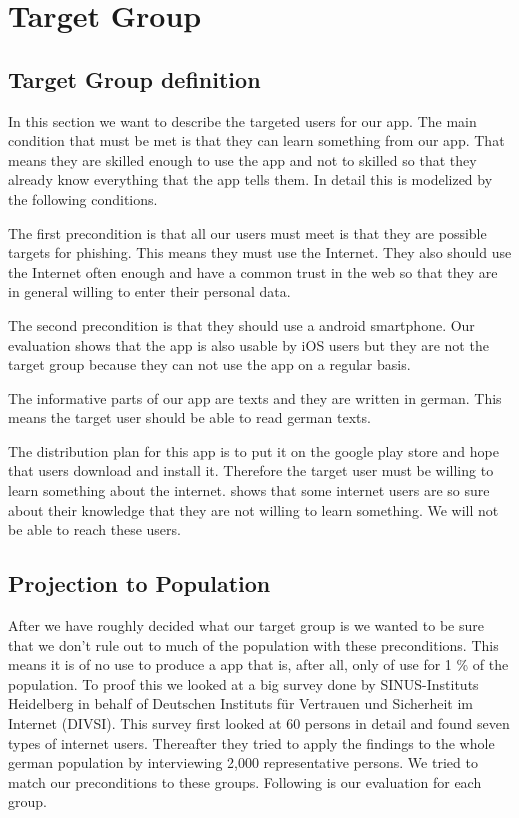 \section{Target Group}
\label{s:target_group}

\subsection{Target Group definition}
In this section we want to describe the targeted users for our app.
The main condition that must be met is that they can learn something from our app.
That means they are skilled enough to use the app and not to skilled so that they already know everything that the app tells them.
In detail this is modelized by the following conditions.
\begin{description}[leftmargin=0cm]
\item[Attackabilty] The first precondition is that all our users must meet is that they are possible targets for phishing.
This means they must use the Internet.
They also should use the Internet often enough and have a common trust in the web so that they are in general willing to enter their personal data.
\cite{divsi2012divsi}
\item[Android users] The second precondition is that they should use a android smartphone.
Our evaluation shows that the app is also usable by iOS users but they are not the target group because they can not use the app on a regular basis.
\item[Language] The informative parts of our app are texts and they are written in german.
This means the target user should be able to read german texts.
\item[Motivation] The distribution plan for this app is to put it on the google play store and hope that users download and install it.
Therefore the target user must be willing to learn something about the internet.
\cite{divsi2012divsi} shows that some internet users are so sure about their knowledge that they are not willing to learn something.
We will not be able to reach these users.
\end{description}

\subsection{Projection to Population}
After we have roughly decided what our target group is we wanted to be sure that we don't rule out to much of the population with these preconditions.
This means it is of no use to produce a app that is, after all, only of use for 1 \% of the population.
To proof this we looked at a big survey done by SINUS-Instituts Heidelberg in behalf of Deutschen Instituts f\"{u}r Vertrauen und Sicherheit im Internet (DIVSI).
This survey first looked at 60 persons in detail and found seven types of internet users.
Thereafter they tried to apply the findings to the whole german population by interviewing 2,000 representative persons.
We tried to match our preconditions to these groups. Following is our evaluation for each group\cite{divsi2012divsi}.

